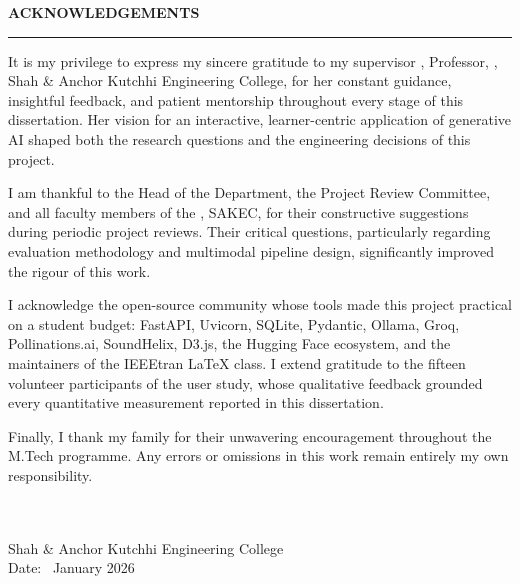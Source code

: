 \thispagestyle{empty}

\begin{center}
{\Large {\bf \uppercase{Acknowledgements}}}
\end{center}

\vspace{\baselineskip}
\hrule
\vspace{2\baselineskip}

\justifying
\setlength{\parskip}{0.6em}

It is my privilege to express my sincere gratitude to my supervisor
\textbf{\mysupervisor}, Professor, \mydep, Shah \& Anchor Kutchhi
Engineering College, for her constant guidance, insightful feedback,
and patient mentorship throughout every stage of this dissertation.
Her vision for an interactive, learner-centric application of
generative AI shaped both the research questions and the engineering
decisions of this project.

I am thankful to the Head of the Department, the Project Review
Committee, and all faculty members of the \mydep, SAKEC, for their
constructive suggestions during periodic project reviews. Their
critical questions, particularly regarding evaluation methodology
and multimodal pipeline design, significantly improved the rigour of
this work.

I acknowledge the open-source community whose tools made this project
practical on a student budget: FastAPI, Uvicorn, SQLite, Pydantic,
Ollama, Groq, Pollinations.ai, SoundHelix, D3.js, the Hugging Face
ecosystem, and the maintainers of the IEEEtran LaTeX class. I extend
gratitude to the fifteen volunteer participants of the user study,
whose qualitative feedback grounded every quantitative measurement
reported in this dissertation.

Finally, I thank my family for their unwavering encouragement
throughout the M.Tech programme. Any errors or omissions in this work
remain entirely my own responsibility.

\bigskip
\bigskip

\noindent
\vspace{\baselineskip} \\
\textbf{\myname} \\
Shah \& Anchor Kutchhi Engineering College \\
Date: \ January 2026
